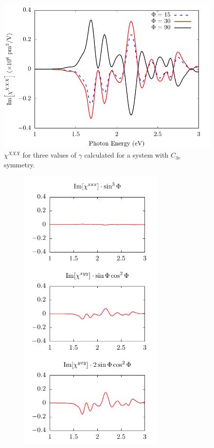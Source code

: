 \documentclass[aps,prb,10pt,letterpaper,notitlepage]{revtex4-1}
\begin{document}
\begin{figure}[t]
\centering
\includegraphics[width=0.4\linewidth]{fig02}
\caption{$\chi^{XXX}$ for three values of $\gamma$ calculated for a system with
$C_{3v}$ symmetry.}
\label{fig:rotxxx}
\end{figure}

\begin{figure}[b]
    \centering
    \begin{subfigure}[b]{0.25\textwidth}
        \includegraphics[width=0.8\textwidth]{fig03a}

\end{subfigure}
\end{figure}
\end{document}

